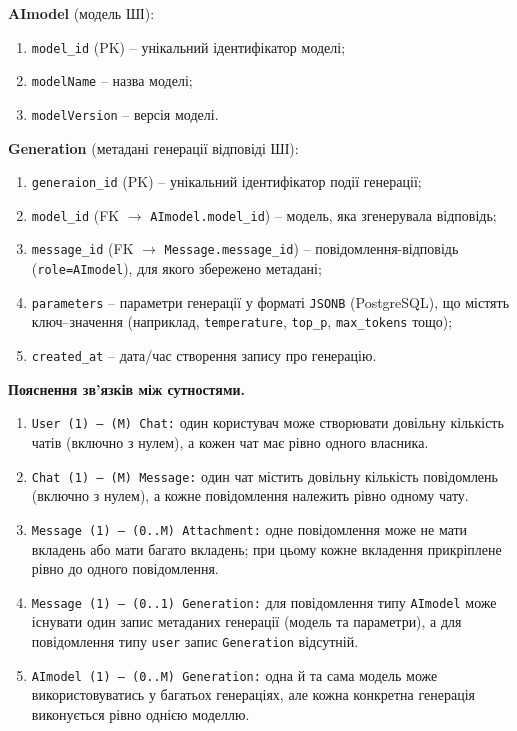 \documentclass[12pt,a4paper]{article}
\begin{document}
    \vspace{0.75em}

    \noindent
    \textbf{AImodel} (модель ШІ):

    \begin{enumerate}
        \item \texttt{model\_id} (PK) -- унікальний ідентифікатор моделі;
        \item \texttt{modelName} -- назва моделі;
        \item \texttt{modelVersion} -- версія моделі.
    \end{enumerate}

    \vspace{0.75em}

    \noindent
    \textbf{Generation} (метадані генерації відповіді ШІ):

    \begin{enumerate}
        \item \texttt{generaion\_id} (PK) -- унікальний ідентифікатор події генерації;
        \item \texttt{model\_id} (FK $\rightarrow$ \texttt{AImodel.model\_id}) -- модель, яка згенерувала відповідь;
        \item \texttt{message\_id} (FK $\rightarrow$ \texttt{Message.message\_id}) -- повідомлення-відповідь (\texttt{role=AImodel}), для якого збережено метадані;
        \item \texttt{parameters} -- параметри генерації у форматі \texttt{JSONB} (PostgreSQL), що містять ключ--значення (наприклад, \texttt{temperature}, \texttt{top\_p}, \texttt{max\_tokens} тощо);
        \item \texttt{created\_at} -- дата/час створення запису про генерацію.
    \end{enumerate}

    \newpage

    \noindent
    \textbf{Пояснення зв'язків між сутностями.}

    \begin{enumerate}
        \item \texttt{User (1) -- (M) Chat:} один користувач може створювати довільну кількість чатів (включно з нулем), а кожен чат має рівно одного власника.
        \item \texttt{Chat (1) -- (M) Message:} один чат містить довільну кількість повідомлень (включно з нулем), а кожне повідомлення належить рівно одному чату.
        \item \texttt{Message (1) -- (0..M) Attachment:} одне повідомлення може не мати вкладень або мати багато вкладень; при цьому кожне вкладення прикріплене рівно до одного повідомлення.
        \item \texttt{Message (1) -- (0..1) Generation:} для повідомлення типу \texttt{AImodel} може існувати один запис метаданих генерації (модель та параметри), а для повідомлення типу \texttt{user} запис \texttt{Generation} відсутній.
        \item \texttt{AImodel (1) -- (0..M) Generation:} одна й та сама модель може використовуватись у багатьох генераціях, але кожна конкретна генерація виконується рівно однією моделлю.
    \end{enumerate}
\end{document}
